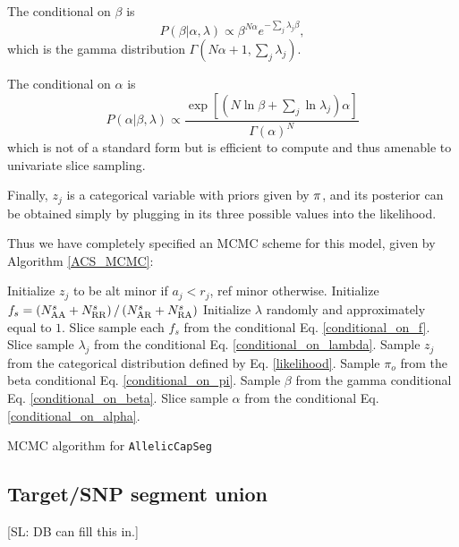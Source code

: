 \documentclass[nofootinbib,amssymb,amsmath]{revtex4}
\newcommand{\ACS}{\texttt{AllelicCapSeg}}
\def\SL#1{{\color [rgb]{0,0,0.8} [SL: #1]}}
\begin{document}
The conditional on $\beta$ is
\begin{equation}
P(\beta | \alpha, \lambda) \propto \beta^{N \alpha} e^{- \sum_j \lambda_j \beta},
\label{conditional_on_beta}
\end{equation}
which is the gamma distribution $\Gamma(N \alpha + 1, \sum_j \lambda_j)$.

The conditional on $\alpha$ is
\begin{equation}
P(\alpha | \beta, \lambda) \propto \frac{\exp \left[ \left( N \ln \beta + \sum_j \ln \lambda_j \right) \alpha \right]}{\Gamma(\alpha)^N}
\label{conditional_on_alpha}
\end{equation}
which is not of a standard form but is efficient to compute and thus amenable to univariate slice sampling.

Finally, $z_j$ is a categorical variable with priors given by ${\rm \pi}$, and its posterior can be obtained simply by plugging in its three possible values into the likelihood.

Thus we have completely specified an MCMC scheme for this model, given by Algorithm \ref{ACS_MCMC}:

\begin{algorithm}
\begin{algorithmic}[1]
\State Initialize $z_j$ to be alt minor if $a_j  < r_j$, ref minor otherwise.
\State Initialize $f_s = \left( N^s_{\rm AA} + N^s_{\rm RR} \right) / \left(N^s_{\rm AR} + N^s_{\rm RA} \right)$
\State Initialize $\lambda$ randomly and approximately equal to $1$.
\Repeat
	\State Slice sample each $f_s$  from the conditional Eq. \ref{conditional_on_f}.
		\State Slice sample $\lambda_j$ from the conditional Eq. \ref{conditional_on_lambda}.
		\State Sample $z_j$ from the categorical distribution defined by Eq. \ref{likelihood}.
	\EndFor
	\State Sample $\pi_o$ from the beta conditional Eq. \ref{conditional_on_pi}.
	\State Sample $\beta$ from the gamma conditional Eq. \ref{conditional_on_beta}.
	\State Slice sample $\alpha$ from the conditional Eq. \ref{conditional_on_alpha}.
\end{algorithmic}
\caption{MCMC algorithm for \ACS}
\label{ACS_MCMC}
\end{algorithm}
\subsection{Target/SNP segment union} \label{targetsnp-segment-union}

\SL{DB can fill this in.}
\end{document}
